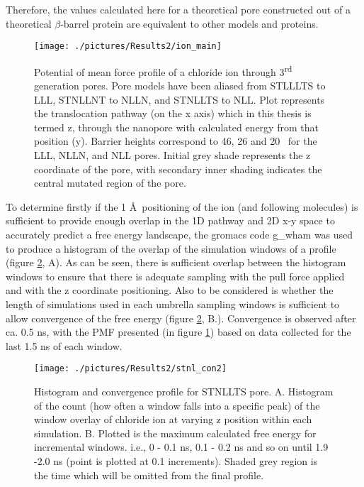 Therefore, the values calculated here for a theoretical pore constructed out of a theoretical $\beta$-barrel protein are equivalent to other models and proteins. 

\begin{figure}[H]
\begin{center}
\texttt{[image: ./pictures/Results2/ion\_main]}
\caption[Potential of mean force profile of a chloride ion through 3\textsuperscript{rd} generation pores.] {Potential of mean force profile of a chloride ion through 3\textsuperscript{rd} generation pores. Pore models have been aliased from STLLLTS to LLL, STNLLNT to NLLN, and STNLLTS to NLL. Plot represents the translocation pathway (on the x axis) which in this thesis is termed z, through the nanopore with calculated energy from that position (y). Barrier heights correspond to 46, 26 and 20 \kj\ for the LLL, NLLN, and NLL pores. Initial grey shade represents the z coordinate of the pore, with secondary inner shading indicates the central mutated region of the pore.}  %
\label{fig:ion_main}
\end{center}
\end{figure}

To determine firstly if the 1 \AA\ positioning of the ion (and following molecules) is sufficient to provide enough overlap in the 1D pathway and 2D x-y space to accurately predict a free energy landscape, the gromacs code g\_wham \cite{Hub2010a} was used to produce a histogram of the overlap of the simulation windows of a profile (figure \ref{fig:stnl_con2}, A). As can be seen, there is sufficient overlap between the histogram windows to ensure that there is adequate sampling with the pull force applied and with the z coordinate positioning. Also to be considered is whether the length of simulations used in each umbrella sampling windows is sufficient to allow convergence of the free energy (figure \ref{fig:stnl_con2}, B.). Convergence is observed after ca. 0.5 ns, with the PMF presented (in figure \ref{fig:ion_main}) based on data collected for the last 1.5 ns of each window. 

\begin{figure}[H]
\begin{center}
\texttt{[image: ./pictures/Results2/stnl\_con2]}
\caption[Histogram and convergence profile for STNLLTS pore.] {Histogram and convergence profile for STNLLTS pore. A. Histogram of the count (how often a window falls into a specific peak) of the window overlay of chloride ion at varying z position within each simulation. B. Plotted is the maximum calculated free energy for incremental windows. i.e., 0 - 0.1 ns, 0.1 - 0.2 ns and so on until 1.9 -2.0 ns (point is plotted at 0.1 increments). Shaded grey region is the time which will be omitted from the final profile.} 
\label{fig:stnl_con2}
\end{center}
\end{figure}

